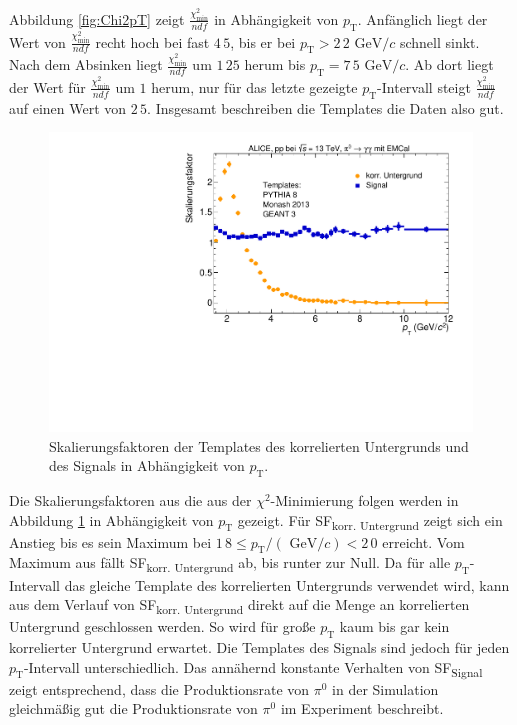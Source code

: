 \newline
Abbildung \ref{fig:Chi2pT} zeigt $\frac{\chi^{2}_\text{min}}{ndf}$ in Abhängigkeit von $p_{\text{T}}$.
Anfänglich liegt der Wert von $\frac{\chi^{2}_\text{min}}{ndf}$ recht hoch bei fast $4\,5$, bis er bei $p_{\text{T}} >2\,2 \text{ GeV}/c$ schnell sinkt.  
Nach dem Absinken liegt $\frac{\chi^{2}_\text{min}}{ndf}$ um $1\,25$ herum bis $p_{\text{T}} = 7\,5\text{ GeV}/c$.
Ab dort liegt der Wert für $\frac{\chi^{2}_\text{min}}{ndf}$ um $1$ herum, nur für das letzte gezeigte $p_{\text{T}}$-Intervall steigt $\frac{\chi^{2}_\text{min}}{ndf}$ auf einen Wert von $2\,5$.
Insgesamt beschreiben die Templates die Daten also gut.
\begin{figure}[t!]
\centering
\includegraphics[width=.65\linewidth]{SF_Data_2016.pdf}
\caption{Skalierungsfaktoren der Templates des korrelierten Untergrunds und des Signals in Abhängigkeit von $p_{\text{T}}$.
}
\label{fig:SF}
\end{figure}
\newline
Die Skalierungsfaktoren aus die aus der $\chi^{2}$-Minimierung folgen werden in Abbildung \ref{fig:SF} in Abhängigkeit von $p_\text{T}$ gezeigt.
Für SF\textsubscript{korr. Untergrund} zeigt sich ein Anstieg bis es sein Maximum bei $1\,8 \leq p_{\text{T}}/(\text{ GeV}/c) < 2\,0$ erreicht.
Vom Maximum aus fällt SF\textsubscript{korr. Untergrund} ab, bis runter zur Null.
Da für alle $p_{\text{T}}$-Intervall das gleiche Template des korrelierten Untergrunds verwendet wird, kann aus dem Verlauf von SF\textsubscript{korr. Untergrund} direkt auf die Menge an korrelierten Untergrund geschlossen werden.
So wird für große $p_{\text{T}}$ kaum bis gar kein korrelierter Untergrund erwartet.
\newline
Die Templates des Signals sind jedoch für jeden $p_{\text{T}}$-Intervall unterschiedlich.
Das annähernd konstante Verhalten von SF\textsubscript{Signal} zeigt entsprechend, dass die Produktionsrate von $\pi^{0}$ in der Simulation gleichmäßig gut die Produktionsrate von $\pi^{0}$ im Experiment beschreibt.